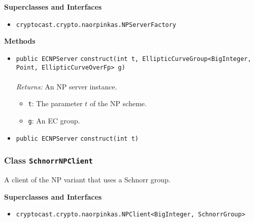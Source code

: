 \textbf{\sffamily Superclasses and Interfaces}
\begin{itemize}
\item \lstinline|cryptocast.crypto.naorpinkas.NPServerFactory|
\end{itemize}



\textbf{\sffamily Methods}
\begin{itemize}
\item \lstinline|public ECNPServer| \lstinline|construct|\lstinline|(int t, EllipticCurveGroup<BigInteger, Point, EllipticCurveOverFp> g)|\\ \\[-0.6em]
\emph{Returns:} An NP server instance.
\begin{itemize}
\item \lstinline|t|: The parameter $t$ of the NP scheme.
\item \lstinline|g|: An EC group.
\end{itemize}



\item \lstinline|public ECNPServer| \lstinline|construct|\lstinline|(int t)| \\[-0.6em]




\end{itemize}

\subsubsection{Class \lstinline|SchnorrNPClient|}
A client of the NP variant that uses a Schnorr group. \\
\noindent\begin{minipage}[t]{5cm}
\vspace{0.3em}
\hspace*{2em}
\vspace{0.3em}
\end{minipage}



\textbf{\sffamily Superclasses and Interfaces}
\begin{itemize}
\item \lstinline|cryptocast.crypto.naorpinkas.NPClient<BigInteger, SchnorrGroup>|
\end{itemize}


